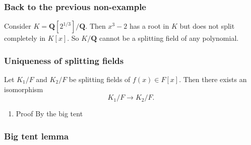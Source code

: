 \documentclass[11pt]{article}
\begin{document}
\subsubsection{Back to the previous non-example}
\label{sec:org5ac833e}
Consider \(K = \mathbf{Q}[2^{1/3}] / \mathbf{Q}\).
Then \(x^3-2\) has a root in \(K\) but does not split completely in \(K[x]\).
So \(K / \mathbf{Q}\) cannot be a splitting field of any polynomial.
\subsubsection{Uniqueness of splitting fields}
\label{sec:orgb2eb72c}
Let \(K_1/F\) and \(K_2/F\) be splitting fields of \(f(x) \in F[x]\).
Then there exists an isomorphism
\[ K_1/F \to K_2/F.\]
\begin{enumerate}
\item Proof
\label{sec:org56a4dfb}
By the big tent
\end{enumerate}
\subsubsection{Big tent lemma}
\label{sec:org9195896}
\end{document}
